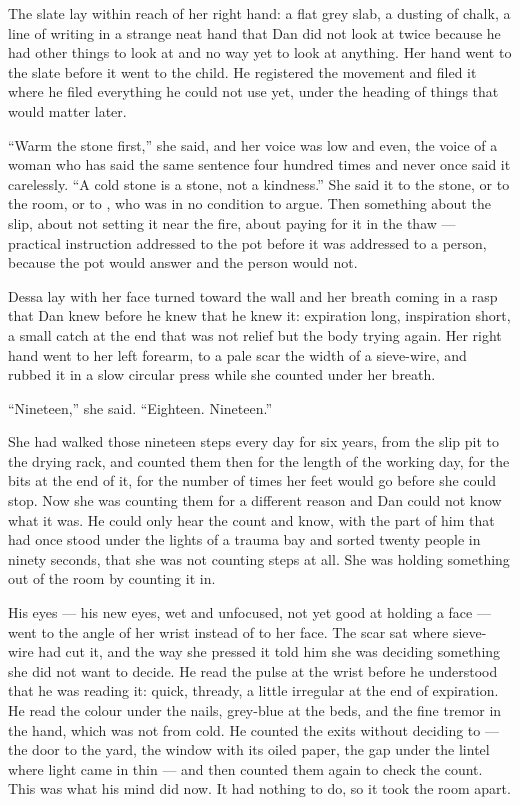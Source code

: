 The slate lay within reach of her right hand: a flat grey slab, a dusting of chalk, a line of writing in a strange neat hand that Dan did not look at twice because he had other things to look at and no way yet to look at anything. Her hand went to the slate before it went to the child. He registered the movement and filed it where he filed everything he could not use yet, under the heading of things that would matter later.

“Warm the stone first,” she said, and her voice was low and even, the voice of a woman who has said the same sentence four hundred times and never once said it carelessly. “A cold stone is a stone, not a kindness.” She said it to the stone, or to the room, or to , who was in no condition to argue. Then something about the slip, about not setting it near the fire, about paying for it in the thaw --- practical instruction addressed to the pot before it was addressed to a person, because the pot would answer and the person would not.

Dessa lay with her face turned toward the wall and her breath coming in a rasp that Dan knew before he knew that he knew it: expiration long, inspiration short, a small catch at the end that was not relief but the body trying again. Her right hand went to her left forearm, to a pale scar the width of a sieve-wire, and rubbed it in a slow circular press while she counted under her breath.

“Nineteen,” she said. “Eighteen. Nineteen.”

She had walked those nineteen steps every day for six years, from the slip pit to the drying rack, and counted them then for the length of the working day, for the bits at the end of it, for the number of times her feet would go before she could stop. Now she was counting them for a different reason and Dan could not know what it was. He could only hear the count and know, with the part of him that had once stood under the lights of a trauma bay and sorted twenty people in ninety seconds, that she was not counting steps at all. She was holding something out of the room by counting it in.

His eyes --- his new eyes, wet and unfocused, not yet good at holding a face --- went to the angle of her wrist instead of to her face. The scar sat where sieve-wire had cut it, and the way she pressed it told him she was deciding something she did not want to decide. He read the pulse at the wrist before he understood that he was reading it: quick, thready, a little irregular at the end of expiration. He read the colour under the nails, grey-blue at the beds, and the fine tremor in the hand, which was not from cold. He counted the exits without deciding to --- the door to the yard, the window with its oiled paper, the gap under the lintel where light came in thin --- and then counted them again to check the count. This was what his mind did now. It had nothing to do, so it took the room apart.


